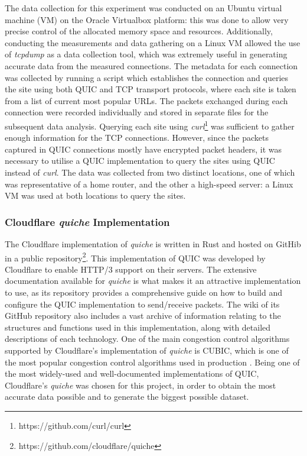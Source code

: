\documentclass{l4proj}
\begin{document}
The data collection for this experiment was conducted on an Ubuntu virtual machine (VM) on the Oracle Virtualbox platform: this was done to allow very precise control of the allocated memory space and resources. Additionally, conducting the measurements and data gathering on a Linux VM allowed the use of \emph{tcpdump} as a data collection tool, which was extremely useful in generating accurate data from the measured connections. The metadata for each connection was collected by running a script which establishes the connection and queries the site using both QUIC and TCP transport protocols, where each site is taken from a list of current most popular URLs. The packets exchanged during each connection were recorded individually and stored in separate files for the subsequent data analysis. Querying each site using \emph{curl}\footnote{https://github.com/curl/curl} was sufficient to gather enough information for the TCP connections. However, since the packets captured in QUIC connections mostly have encrypted packet headers, it was necessary to utilise a QUIC implementation to query the sites using QUIC instead of \emph{curl}. The data was collected from two distinct locations, one of which was representative of a home router, and the other a high-speed server: a Linux VM was used at both locations to query the sites.

\subsubsection{Cloudflare \emph{quiche} Implementation} The Cloudflare implementation of \emph{quiche} is written in Rust and hosted on GitHib in a public repository\footnote{https://github.com/cloudflare/quiche}. This implementation of QUIC was developed by Cloudflare to enable HTTP/3 support on their servers. The extensive documentation available for \emph{quiche} is what makes it an attractive implementation to use, as its repository provides a comprehensive guide on how to build and configure the QUIC implementation to send/receive packets. The wiki of its GitHub repository also includes a vast archive of information relating to the structures and functions used in this implementation, along with detailed descriptions of each technology. One of the main congestion control algorithms supported by Cloudflare's implementation of \emph{quiche} is CUBIC, which is one of the most popular congestion control algorithms used in production \citep{Hertel2022}. Being one of the most widely-used and well-documented implementations of QUIC, Cloudflare's \emph{quiche} was chosen for this project, in order to obtain the most accurate data possible and to generate the biggest possible dataset.
\end{document}
